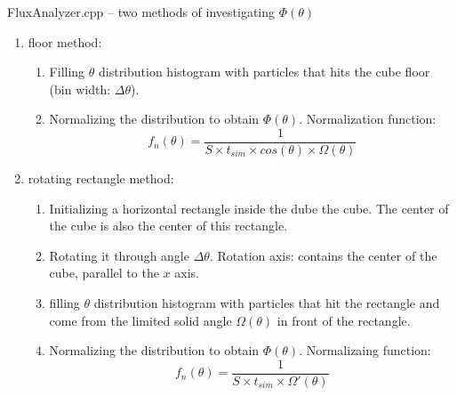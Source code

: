 \documentclass{beamer}
\begin{document}
\begin{frame}{FluxAnalyzer.cpp -- two methods of investigating $\Phi(\theta)$}
\begin{enumerate}
\item floor method:
	\begin{enumerate}
	\item Filling $\theta$ distribution histogram with particles that hits the cube floor (bin width: $\Delta \theta$).
	\item Normalizing the distribution to obtain $\Phi(\theta)$. Normalization function:
	\[
	f_n(\theta)=\frac{1}{S \times t_{sim} \times cos(\theta) \times \Omega(\theta)}
	\]
	\end{enumerate}
	
\item rotating rectangle method:
	\begin{enumerate}
	\item Initializing a horizontal rectangle inside the dube the cube. The center of the cube is also the center of this rectangle.
	\item Rotating it through angle $\Delta \theta$. Rotation axis: contains the center of the cube, parallel to the $x$ axis.
	\item filling $\theta$ distribution histogram with particles that hit the rectangle and come from the limited solid angle $\Omega(\theta)$ in front of the rectangle.
	\item Normalizing the distribution to obtain $\Phi(\theta)$. Normalizaing function:
	\[
	f_n(\theta)=\frac{1}{S \times t_{sim} \times \Omega'(\theta)}
	\]
	\end{enumerate}
\end{enumerate}
\end{frame}
\end{document}

